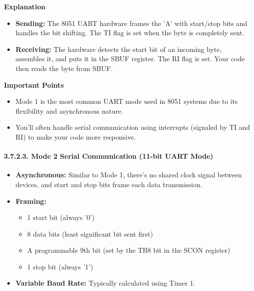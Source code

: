 \documentclass[
]{article}
\begin{document}
\textbf{Explanation}

\begin{itemize}
\item
  \textbf{Sending:} The 8051 UART hardware frames the 'A' with
  start/stop bits and handles the bit shifting. The TI flag is set when
  the byte is completely sent.
\item
  \textbf{Receiving:} The hardware detects the start bit of an incoming
  byte, assembles it, and puts it in the SBUF register. The RI flag is
  set. Your code then reads the byte from SBUF.
\end{itemize}

\textbf{Important Points}

\begin{itemize}
\item
  Mode 1 is the most common UART mode used in 8051 systems due to its
  flexibility and asynchronous nature.
\item
  You'll often handle serial communication using interrupts (signaled by
  TI and RI) to make your code more responsive.
\end{itemize}

\hypertarget{3723-mode-2-serial-communication-11-bit-uart-mode}{%
\paragraph{3.7.2.3. Mode 2 Serial Communication (11-bit UART
Mode)}\label{3723-mode-2-serial-communication-11-bit-uart-mode}}

\begin{itemize}
\item
  \textbf{Asynchronous:} Similar to Mode 1, there's no shared clock
  signal between devices, and start and stop bits frame each data
  transmission.
\item
  \textbf{Framing:}

  \begin{itemize}
  \item
    1 start bit (always '0')
  \item
    8 data bits (least significant bit sent first)
  \item
    A programmable 9th bit (set by the TB8 bit in the SCON register)
  \item
    1 stop bit (always '1')
  \end{itemize}
\item
  \textbf{Variable Baud Rate:} Typically calculated using Timer 1.
\end{itemize}
\end{document}
